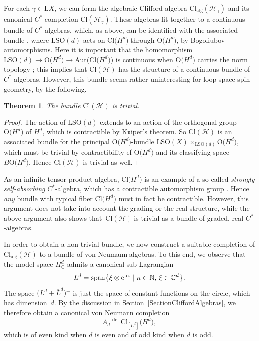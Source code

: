 \documentclass[11pt]{article}
\numberwithin{equation}{section}
\numberwithin{equation}{section}
\newtheorem{Theorem}{Theorem}[section]
\newcommand{\N}{\mathbb{N}}
\newcommand{\C}{\mathbb{C}}
\newcommand{\Cl}{\mathrm{Cl}}
\newcommand{\SO}{\mathrm{SO}}
\newcommand{\Aut}{\mathrm{Aut}}
\renewcommand{\O}{\mathrm{O}}
\renewcommand{\L}{\mathrm{L}}
\newcommand{\defeq}{\stackrel{\mathrm{def}}{=}}
\begin{document}
For each $\gamma \in \L X$, we can form the algebraic Clifford algebra $\Cl_{\mathrm{alg}}(\mathcal{H}_\gamma)$ and its canonical $C^*$-completion $\Cl(\mathcal{H}_\gamma)$.
These algebras fit together to a continuous bundle of $C^*$-algebras, which, as above, can be identified with the associated bundle \smash{$\L \SO(X) \times_{\L\SO(d)} \Cl\big(H^d\big)$}, where $\L\SO(d)$ acts on $\Cl\big(H^d\big)$ through $\O\big(H^d\big)$, by Bogoliubov automorphisms.
Here it is important that the homomorphism $\L\SO(d) \to \O\big(H^d\big) \to \Aut\big(\Cl\big(H^d\big)\big)$ is continuous when $\O\big(H^d\big)$ carries the norm topology \cite[Proposition~4.35]{Ambler2012}; this implies that $\Cl(\mathcal{H})$ has the structure of a continuous bundle of $C^*$-algebras.
However, this bundle seems rather uninteresting for loop space spin geometry, by the following.

\begin{Theorem}
 The bundle $\Cl(\mathcal{H})$ is trivial.
\end{Theorem}

\begin{proof}
The action of $\L\SO(d)$ extends to an action of the orthogonal group $\O\big(H^d\big)$ of $H^d$, which is contractible by Kuiper's theorem.
So $\Cl(\mathcal{H})$ is an associated bundle for the principal $\O\big(H^d\big)$-bundle $\L\SO(X) \times_{\L\SO(d)} \O\big(H^d\big)$, which must be trivial by contractibility of $\O\big(H^d\big)$ and its classifying space $B\O\big(H^d\big)$.
Hence $\Cl(\mathcal{H})$ is trivial as well.
\end{proof}

\begin{Remark}
As an infinite tensor product algebra, $\Cl\big(H^d\big)$ is an example of a so-called \emph{strongly self-absorbing} $C^*$-algebra, which has a contractible automorphism group \cite{DardalatPennig,DardalatWinter}.
Hence \emph{any} bundle with typical fiber $\Cl\big(H^d\big)$ must in fact be contractible.
However, this argument does not take into account the grading or the real structure, while the above argument also shows that~$\Cl(\mathcal{H})$ is trivial as a bundle of graded, real $C^*$-algebras.
\end{Remark}

In order to obtain a non-trivial bundle, we now construct a suitable completion of $\Cl_{\mathrm{alg}}(\mathcal{H})$ to a bundle of von Neumann algebras.
To this end, we observe that the model space $H^d_\C$ admits a canonical sub-Lagrangian
\begin{equation}
\label{SubLagrangianLd}
 L^d = \mathrm{span}\big\{ \xi \otimes{\rm e}^{\rm int} \mid n \in \N, \, \xi \in \C^d\big\}.
\end{equation}
The space $\big(L^d + \overline{L}^d\big)^\perp$ is just the space of constant functions on the circle, which has dimension~$d$.
By the discussion in Section~\ref{SectionCliffordAlgebras}, we therefore obtain a canonical von Neumann completion
\begin{equation} \label{DefinitionAd}
A_d \defeq \Cl_{[L^d]}\big(H^d\big),
\end{equation}
which is of even kind when $d$ is even and of odd kind when $d$ is odd.
\end{document}
